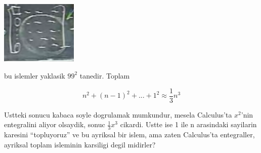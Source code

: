 \documentclass[12pt,fleqn]{article}\usepackage{../common}
\begin{document}
\includegraphics[height=3cm]{02.png}

bu islemler yaklasik $99^2$ tanedir. Toplam

\[ n^2 + (n-1)^2 + ... + 1^2 \approx \frac{ 1}{3} n^3 \]

Ustteki sonucu kabaca soyle dogrulamak mumkundur, mesela Calculus'ta
$x^2$'nin entegralini aliyor olsaydik, sonuc $\frac{ 1}{3}x^3$
cikardi. Ustte ise 1 ile n arasindaki sayilarin karesini ``topluyoruz'' ve
bu ayriksal bir islem, ama zaten Calculus'ta entegraller, ayriksal toplam
isleminin karsiligi degil midirler? 
\end{document}
